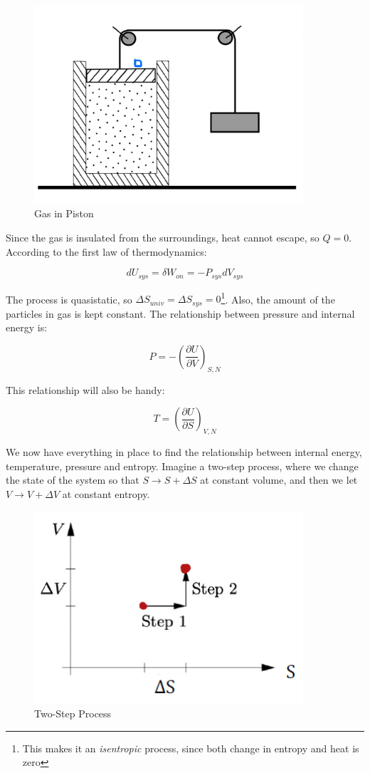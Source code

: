 \begin{figure}[H]
	\centering
	\includegraphics[width=100mm]{35.png}
	\caption{Gas in Piston}
\end{figure}

Since the gas is insulated from the surroundings, heat cannot escape, so $Q=0$. According to the first law of thermodynamics:

\[dU_{sys}=\delta W_{on}=-P_{sys} dV_{sys}\]

The process is quasistatic, so $\Delta S_{univ}=\Delta S_{sys}=0$\footnote{This makes it an \textit{isentropic} process, since both change in entropy and heat is zero}. Also, the amount of the particles in gas is kept constant. The relationship between pressure and internal energy is:

\[\boxed{P=-\left( \frac{\partial U}{\partial V} \right)_{S,N}}\]

This relationship will also be handy:

\[T=\left( \frac{\partial U}{\partial S} \right)_{V,N}\]

We now have everything in place to find the relationship between internal energy, temperature, pressure and entropy. Imagine a two-step process, where we change the state of the system so that $S\to S+\Delta S$ at constant volume, and then we let $V\to V+\Delta V$ at constant entropy.

\begin{figure}[H]
	\centering
	\includegraphics[width=100mm]{36.png}
	\caption{Two-Step Process}
\end{figure}

